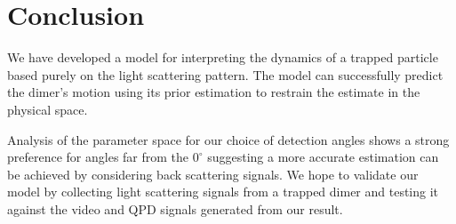 \documentclass[11pt]{article}
\begin{document}
	\section*{Conclusion}
	We have developed a model for interpreting the dynamics of a trapped particle based purely on the light scattering pattern. The model can successfully predict the dimer's motion using its prior estimation to restrain the estimate in the physical space. 
	
	Analysis of the parameter space for our choice of detection angles shows a strong preference for angles far from the $0^{\circ}$ suggesting a more accurate estimation can be achieved by considering back scattering signals. We hope to validate our model by collecting light scattering signals from a trapped dimer and testing it against the video and QPD signals generated from our result. 
	
	 
	
\end{document}
